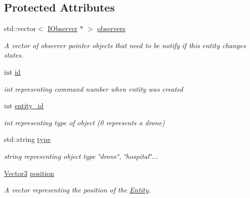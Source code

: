 \subsection*{Protected Attributes}
\begin{DoxyCompactItemize}
\item 
\mbox{\label{classEntity_a6e98ade5dc4d06116b35b3447afbf75b}} 
std\+::vector$<$ \hyperlink{classIObserver}{I\+Observer} $\ast$ $>$ \hyperlink{classEntity_a6e98ade5dc4d06116b35b3447afbf75b}{observers}
\begin{DoxyCompactList}\small\item\em A vector of observer pointer objects that need to be notify if this entity changes states. \end{DoxyCompactList}\item 
\mbox{\label{classEntity_aa4425a59c337b4d3b71c217ccaf511bc}} 
int \hyperlink{classEntity_aa4425a59c337b4d3b71c217ccaf511bc}{id}
\begin{DoxyCompactList}\small\item\em int representing command number when entity was created \end{DoxyCompactList}\item 
\mbox{\label{classEntity_a3aa2fdf81f48766096b7b92c9972b13a}} 
int \hyperlink{classEntity_a3aa2fdf81f48766096b7b92c9972b13a}{entity\+\_\+id}
\begin{DoxyCompactList}\small\item\em int representing type of object (0 represents a drone) \end{DoxyCompactList}\item 
\mbox{\label{classEntity_a298a9ebf2474bb00874b5ff6a0d637ef}} 
std\+::string \hyperlink{classEntity_a298a9ebf2474bb00874b5ff6a0d637ef}{type}
\begin{DoxyCompactList}\small\item\em string representing object type \char`\"{}drone\char`\"{}, \char`\"{}hospital\char`\"{}... \end{DoxyCompactList}\item 
\mbox{\label{classEntity_a09590883f0fae6e8e28751ccae8b4e93}} 
\hyperlink{classVector3}{Vector3} \hyperlink{classEntity_a09590883f0fae6e8e28751ccae8b4e93}{position}
\begin{DoxyCompactList}\small\item\em A vector representing the position of the \hyperlink{classEntity}{Entity}. \end{DoxyCompactList}\item 

\end{DoxyCompactItemize}

